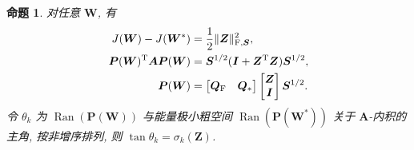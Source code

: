 \documentclass{ctexart}
\newcommand{\T}{\mathrm{T}}
\DeclareMathOperator{\Ran}{Ran}
\DeclarePairedDelimiter\norm{\lVert}{\rVert}
\newtheorem{proposition}[theorem]{命题}
\begin{document}
\begin{proposition}
\label{prop:normalized-geometry}
对任意 $\bm W$, 有
\begin{align}
    J(\bm W)-J(\bm W^{\ast})&=\frac{1}{2}\norm{\bm Z}_{\mathrm{F},\bm S}^2,
    \label{eq:normalized-energy-gap}\\
    \bm P(\bm W)^\T\bm A\bm P(\bm W)&=\bm S^{1/2}(\bm I+\bm Z^\T\bm Z)\bm S^{1/2},
    \label{eq:normalized-coarse-matrix}\\
    \bm P(\bm W)&=\begin{bmatrix}
        \bm Q_{\mathrm{F}} & \bm Q_{\ast}
    \end{bmatrix}
    \begin{bmatrix}
        \bm Z\\
        \bm I
    \end{bmatrix}\bm S^{1/2}.
    \label{eq:interpolation-graph-factorization}
\end{align}
令 $\theta_k$ 为 $\Ran(\bm P(\bm W))$ 与能量极小粗空间 $\Ran(\bm P(\bm W^\ast))$ 关于 $\bm A$-内积的主角, 按非增序排列, 则 $\tan\theta_k=\sigma_k(\bm Z)$.
\end{proposition}
\end{document}
